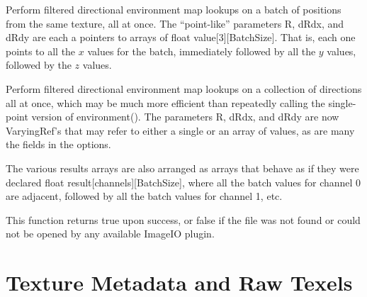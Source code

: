 
Perform filtered directional environment map lookups on a batch of positions
from the same texture, all at once. The ``point-like'' parameters {\cf R},
{\cf dRdx}, and {\cf dRdy} are each a pointers to arrays of
{\cf float value[3][BatchSize]}. That is, each one points to all the $x$ values
for the batch, immediately followed by all the $y$ values, followed by the
$z$ values.

Perform filtered directional environment map lookups on a collection of
directions all at once, which may be much more efficient than repeatedly
calling the single-point version of {\cf environment()}.  The parameters
{\cf R}, {\cf dRdx}, and {\cf dRdy} are now {\cf VaryingRef}'s that may
refer to either a single or an array of values, as are many the fields in
the {\cf options}.

The various results arrays are also arranged as arrays that behave as if
they were declared {\cf  float result[channels][BatchSize]}, where all the
batch values for channel 0 are adjacent, followed by all the batch values
for channel 1, etc.

This function returns {\cf true} upon success, or {\cf false} if the
file was not found or could not be opened by any available ImageIO
plugin.
\apiend


\section{Texture Metadata and Raw Texels}
\label{sec:texturesys:api:gettextureinfo}
\label{sec:texturesys:api:getimagespec}

